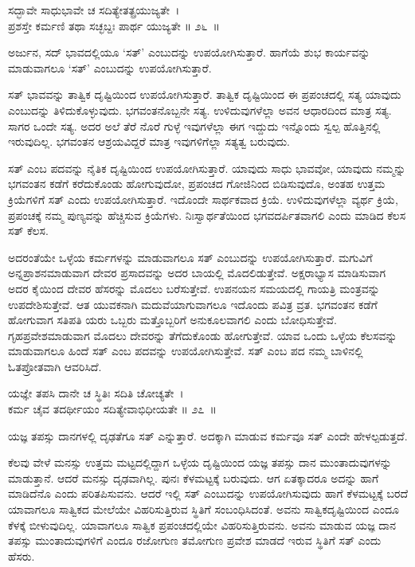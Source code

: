 \begin{shloka}
ಸದ್ಭಾವೇ ಸಾಧುಭಾವೇ ಚ ಸದಿತ್ಯೇತತ್ಪ್ರಯುಜ್ಯತೇ~।\\ಪ್ರಶಸ್ತೇ ಕರ್ಮಣಿ ತಥಾ ಸಚ್ಛಬ್ದಃ ಪಾರ್ಥ ಯುಜ್ಯತೇ \hfill॥ ೨೬~॥
\end{shloka}

\begin{artha}
ಅರ್ಜುನ, ಸದ್ ಭಾವದಲ್ಲಿಯೂ ‘ಸತ್​’ ಎಂಬುದನ್ನು ಉಪಯೋಗಿಸುತ್ತಾರೆ. ಹಾಗೆಯೆ ಶುಭ ಕಾರ್ಯವನ್ನು ಮಾಡುವಾಗಲೂ ‘ಸತ್​’ ಎಂಬುದನ್ನು ಉಪಯೋಗಿಸುತ್ತಾರೆ.
\end{artha}

ಸತ್ ಭಾವವನ್ನು ತಾತ್ವಿಕ ದೃಷ್ಟಿಯಿಂದ ಉಪಯೋಗಿಸುತ್ತಾರೆ. ತಾತ್ವಿಕ ದೃಷ್ಟಿಯಿಂದ ಈ ಪ್ರಪಂಚದಲ್ಲಿ ಸತ್ಯ ಯಾವುದು ಎಂಬುದನ್ನು ತಿಳಿದುಕೊಳ್ಳುವುದು. ಭಗವಂತನೊಬ್ಬನೇ ಸತ್ಯ. ಉಳಿದುವುಗಳೆಲ್ಲಾ ಅವನ ಆಧಾರದಿಂದ ಮಾತ್ರ ಸತ್ಯ. ಸಾಗರ ಒಂದೇ ಸತ್ಯ. ಅದರ ಅಲೆ ತೆರೆ ನೊರೆ ಗುಳ್ಳೆ ಇವುಗಳೆಲ್ಲಾ ಈಗ ಇದ್ದುದು ಇನ್ನೊಂದು ಸ್ವಲ್ಪ ಹೊತ್ತಿನಲ್ಲಿ ಇರುವುದಿಲ್ಲ. ಭಗವಂತನ ಆಶ್ರಯವಿದ್ದರೆ ಮಾತ್ರ ಇವುಗಳಿಗೆಲ್ಲಾ ಸತ್ಯತ್ವ ಬರುವುದು.

ಸತ್ ಎಂಬ ಪದವನ್ನು ನೈತಿಕ ದೃಷ್ಟಿಯಿಂದ ಉಪಯೋಗಿಸುತ್ತಾರೆ. ಯಾವುದು ಸಾಧು ಭಾವವೋ, ಯಾವುದು ನಮ್ಮನ್ನು ಭಗವಂತನ ಕಡೆಗೆ ಕರೆದುಕೊಂಡು ಹೋಗುವುದೋ, ಪ್ರಪಂಚದ ಗೋಜಿನಿಂದ ಬಿಡಿಸುವುದೊ, ಅಂತಹ ಉತ್ತಮ ಕ್ರಿಯೆಗಳಿಗೆ ಸತ್ ಎಂದು ಉಪಯೋಗಿಸುತ್ತಾರೆ. ಇದೊಂದೇ ಸಾರ್ಥಕವಾದ ಕ್ರಿಯೆ. ಉಳಿದುವುಗಳೆಲ್ಲಾ ವ್ಯರ್ಥ ಕ್ರಿಯೆ, ಪ್ರಪಂಚಕ್ಕೆ ನಮ್ಮ ಪುಣ್ಯವನ್ನು ಹೆಚ್ಚಿಸುವ ಕ್ರಿಯೆಗಳು. ನಿಃಸ್ವಾರ್ಥತೆಯಿಂದ ಭಗವದರ್ಪಿತವಾಗಲಿ ಎಂದು ಮಾಡಿದ ಕೆಲಸ ಸತ್ ಕೆಲಸ.

\newpage

ಅದರಂತೆಯೇ ಒಳ್ಳೆಯ ಕರ್ಮಗಳನ್ನು ಮಾಡುವಾಗಲೂ ಸತ್ ಎಂಬುದನ್ನು ಉಪಯೋಗಿ\-ಸುತ್ತಾರೆ. ಮಗುವಿಗೆ ಅನ್ನಪ್ರಾಶನಮಾಡುವಾಗ ದೇವರ ಪ್ರಸಾದವನ್ನು ಅದರ ಬಾಯಲ್ಲಿ ಮೊದಲಿಡುತ್ತೇವೆ. ಅಕ್ಷರಾಭ್ಯಾಸ ಮಾಡಿಸುವಾಗ ಅದರ ಕೈಯಿಂದ ದೇವರ ಹೆಸರನ್ನು ಮೊದಲು ಬರೆಸುತ್ತೇವೆ. ಉಪನಯನ ಸಮಯದಲ್ಲಿ ಗಾಯತ್ರಿ ಮಂತ್ರವನ್ನು ಉಪದೇಶಿಸುತ್ತೇವೆ. ಆತ ಯುವಕನಾಗಿ ಮದುವೆಯಾಗುವಾಗಲೂ ಇದೊಂದು ಪವಿತ್ರ ವ್ರತ. ಭಗವಂತನ ಕಡೆಗೆ ಹೋಗುವಾಗ ಸತಿಪತಿ ಯರು ಒಬ್ಬರು ಮತ್ತೊಬ್ಬರಿಗೆ ಅನುಕೂಲವಾಗಲಿ ಎಂದು ಬೋಧಿಸುತ್ತೇವೆ. ಗೃಹಪ್ರವೇಶಮಾಡುವಾಗ ಮೊದಲು ದೇವರನ್ನು ತೆಗೆದುಕೊಂಡು ಹೋಗುತ್ತೇವೆ. ಯಾವ ಒಂದು ಒಳ್ಳೆಯ ಕೆಲಸವನ್ನು ಮಾಡುವಾಗಲೂ ಹಿಂದೆ ಸತ್ ಎಂಬ ಪದವನ್ನು ಉಪಯೋಗಿಸುತ್ತೇವೆ. ಸತ್ ಎಂಬ ಪದ ನಮ್ಮ ಬಾಳಿನಲ್ಲಿ ಓತಪ್ರೋತವಾಗಿ ಆವರಿಸಿದೆ.

\begin{shloka}
ಯಜ್ಞೇ ತಪಸಿ ದಾನೇ ಚ ಸ್ಥಿತಿಃ ಸದಿತಿ ಚೋಚ್ಯತೇ~।\\ಕರ್ಮ ಚೈವ ತದರ್ಥೀಯಂ ಸದಿತ್ಯೇವಾಭಿಧೀಯತೇ \hfill॥ ೨೭~॥
\end{shloka}

\begin{artha}
ಯಜ್ಞ ತಪಸ್ಸು ದಾನಗಳಲ್ಲಿ ದೃಢತೆಗೂ ಸತ್ ಎನ್ನುತ್ತಾರೆ. ಅದಕ್ಕಾಗಿ ಮಾಡುವ ಕರ್ಮವೂ ಸತ್ ಎಂದೇ ಹೇಳಲ್ಪಡುತ್ತದೆ.
\end{artha}

ಕೆಲವು ವೇಳೆ ಮನಸ್ಸು ಉತ್ತಮ ಮಟ್ಟದಲ್ಲಿದ್ದಾಗ ಒಳ್ಳೆಯ ದೃಷ್ಟಿಯಿಂದ ಯಜ್ಞ ತಪಸ್ಸು ದಾನ ಮುಂತಾದುವುಗಳನ್ನು ಮಾಡುತ್ತಾನೆ. ಆದರೆ ಮನಸ್ಸು ದೃಢವಾಗಿಲ್ಲ. ಪುನಃ ಕೆಳಮಟ್ಟಕ್ಕೆ ಬರುವುದು. ಆಗ ಏತಕ್ಕಾದರೂ ಅದನ್ನು ಹಾಗೆ ಮಾಡಿದೆನೊ ಎಂದು ಪರಿತಪಿಸುವನು. ಆದರೆ ಇಲ್ಲಿ ಸತ್ ಎಂಬುದನ್ನು ಉಪಯೋಗಿಸುವುದು ಹಾಗೆ ಕೆಳಮಟ್ಟಕ್ಕೆ ಬರದೆ ಯಾವಾಗಲೂ ಸಾತ್ವಿಕದ ಮೇಲೆಯೇ ವಿಹರಿಸುತ್ತಿರುವ ಸ್ಥಿತಿಗೆ ಸಂಬಂಧಿಸಿದಂತೆ. ಅವನು ಸಾತ್ವಿಕದೃಷ್ಟಿಯಿಂದ ಎಂದೂ ಕೆಳಕ್ಕೆ ಬೀಳುವುದಿಲ್ಲ. ಯಾವಾಗಲೂ ಸಾತ್ವಿಕ ಪ್ರಪಂಚದಲ್ಲಿಯೇ ವಿಹರಿಸುತ್ತಿರುವನು. ಅವನು ಮಾಡುವ ಯಜ್ಞ ದಾನ ತಪಸ್ಸು ಮುಂತಾದುವುಗಳಿಗೆ ಎಂದೂ ರಜೋಗುಣ ತಮೋಗುಣ ಪ್ರವೇಶ ಮಾಡದೆ ಇರುವ ಸ್ಥಿತಿಗೆ ಸತ್ ಎಂದು ಹೆಸರು.

